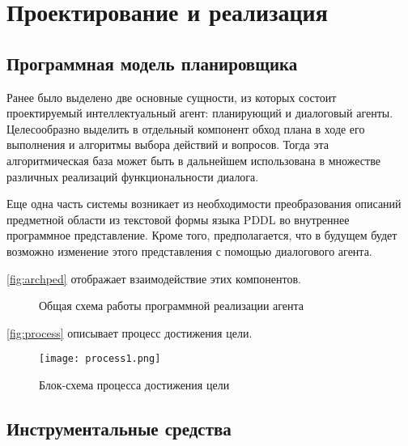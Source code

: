\chapter{Проектирование и реализация}

\section{Программная модель планировщика}

Ранее было выделено две основные сущности, из которых состоит проектируемый интеллектуальный агент: планирующий и диалоговый агенты. Целесообразно выделить в отдельный компонент обход плана в ходе его выполнения и алгоритмы выбора действий и вопросов. Тогда эта алгоритмическая база может быть в дальнейшем использована в множестве различных реализаций функциональности диалога.

Еще одна часть системы возникает из необходимости преобразования описаний предметной области из текстовой формы языка PDDL во внутреннее программное представление. Кроме того, предполагается, что в будущем будет возможно изменение этого представления с помощью диалогового агента.

\autoref{fig:archped} отображает взаимодействие этих компонентов.

\begin{figure}[H]
 \centering


 \caption{Общая схема работы программной реализации агента}
 \label{fig:archped}
\end{figure}

\autoref{fig:process} описывает процесс достижения цели.

\begin{figure}[H]
 \centering
 \texttt{[image: process1.png]}
 \caption{Блок-схема процесса достижения цели}
 \label{fig:process}
\end{figure}

\section{Инструментальные средства}

